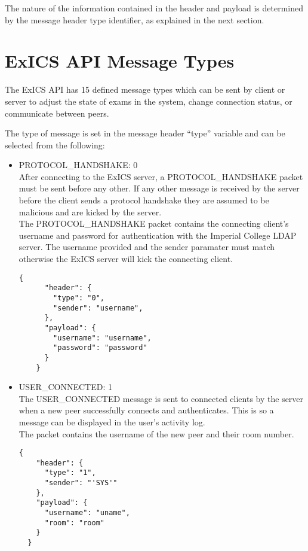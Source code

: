 The nature of the information contained in the header and payload is determined by the message header type identifier, as explained in the next section.

\FloatBarrier

\section{ExICS API Message Types}

The ExICS API has 15 defined message types which can be sent by client or server to adjust the state of exams in the system, change connection status, or communicate between peers.

The type of message is set in the message header ``type'' variable and can be selected from the following:

\begin{itemize}

\item PROTOCOL\_HANDSHAKE: 0\\
  After connecting to the ExICS server, a PROTOCOL\_HANDSHAKE packet must be sent before any other.  If any other message is received by the server before the client sends a protocol handshake they are assumed to be malicious and are kicked by the server.\\
  The PROTOCOL\_HANDSHAKE packet contains the connecting client's username and password for authentication with the Imperial College LDAP server.  The username provided and the sender paramater must match otherwise the ExICS server will kick the connecting client.
  \lstset{language=JSON}
  \begin{lstlisting}[tabsize=2,breaklines=true]
    {
      "header": {
        "type": "0",
        "sender": "username",
      },
      "payload": {
        "username": "username",
        "password": "password"
      }
    }
  \end{lstlisting}

\item USER\_CONNECTED: 1\\
  The USER\_CONNECTED message is sent to connected clients by the server when a new peer successfully connects and authenticates.  This is so a message can be displayed in the user's activity log.\\
  The packet contains the username of the new peer and their room number.
  \lstset{language=JSON}
  \begin{lstlisting}[tabsize=2,breaklines=true]
  {
    "header": {
      "type": "1",
      "sender": "'SYS'"
    },
    "payload": {
      "username": "uname",
      "room": "room"
    }
  }
  \end{lstlisting}


\end{itemize}
